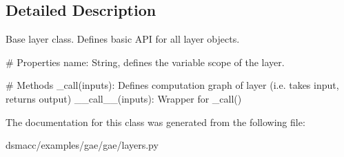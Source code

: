 \subsection{Detailed Description}
\begin{DoxyVerb}Base layer class. Defines basic API for all layer objects.

# Properties
    name: String, defines the variable scope of the layer.

# Methods
    _call(inputs): Defines computation graph of layer
        (i.e. takes input, returns output)
    __call__(inputs): Wrapper for _call()
\end{DoxyVerb}
 

The documentation for this class was generated from the following file\+:\begin{DoxyCompactItemize}
\item 
dsmacc/examples/gae/gae/layers.\+py\end{DoxyCompactItemize}
